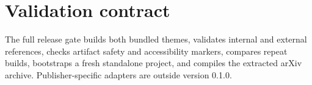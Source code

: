 \section{Validation contract}

The full release gate builds both bundled themes, validates internal and
external references, checks artifact safety and accessibility markers, compares
repeat builds, bootstraps a fresh standalone project, and compiles the extracted
arXiv archive. Publisher-specific adapters are outside version 0.1.0.
